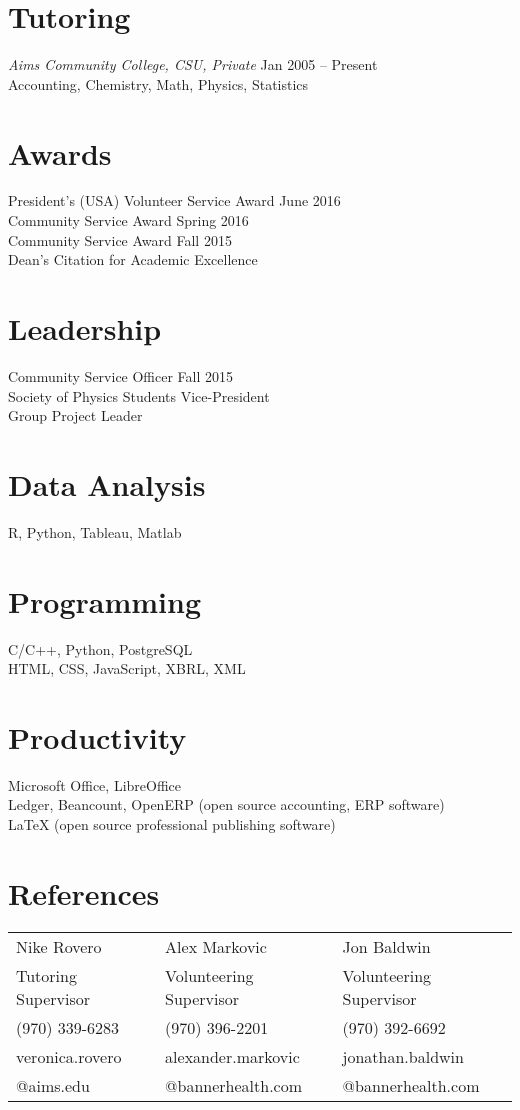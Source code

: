 \documentclass[margin]{res}
\begin{document}
\begin{resume}
\section{Tutoring}
{\sl Aims Community College, CSU, Private} \hfill Jan 2005 -- Present\\
Accounting, Chemistry, Math, Physics, Statistics

\section{Awards}
President's (USA) Volunteer Service Award \hfill June 2016\\
\textBeta \textAlpha \textPsi{ }Community Service Award \hfill Spring 2016\\
\textBeta \textAlpha \textPsi{ }Community Service Award \hfill   Fall 2015\\
Dean's Citation for Academic Excellence

\section{Leadership}
\textBeta \textAlpha \textPsi{ }Community Service Officer \hfill Fall 2015\\
Society of Physics Students Vice-President\\
Group Project Leader

\section{Data Analysis}
R, Python, Tableau, Matlab

\section{Programming}
C/C++, Python, PostgreSQL\\
HTML, CSS, JavaScript, XBRL, XML

\section{Productivity}
Microsoft Office, LibreOffice\\
Ledger, Beancount, OpenERP (open source accounting, ERP software)\\
LaTeX (open source professional publishing software)

\section{References}
\hskip-0.08in
\begin{tabular}{lll}
Nike Rovero         & Alex Markovic            & Jon Baldwin             \\
Tutoring Supervisor & Volunteering Supervisor  & Volunteering Supervisor \\
(970) 339-6283      & (970) 396-2201           & (970) 392-6692          \\
veronica.rovero     & alexander.markovic       & jonathan.baldwin        \\
@aims.edu           & @bannerhealth.com        & @bannerhealth.com       
\end{tabular}

\end{resume}
\end{document}
